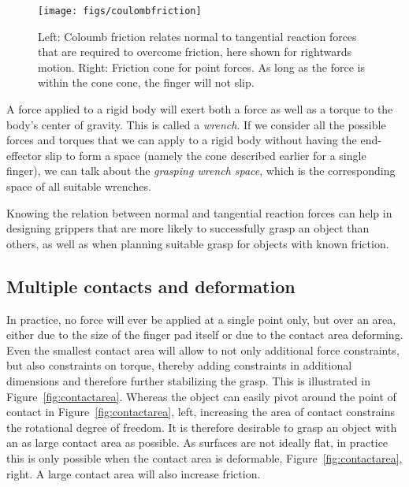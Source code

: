 \begin{figure}
\texttt{[image: figs/coulombfriction]}
\caption{Left: Coloumb friction relates normal to tangential reaction forces that are required to overcome friction, here shown for rightwards motion. Right: Friction cone for point forces. As long as the force is within the cone cone, the finger will not slip.} 
\end{figure}

A force applied to a rigid body will exert both a force as well as a torque to the body's center of gravity. This is called a \emph{wrench}. If we consider all the possible forces and torques that we can apply to a rigid body without having the end-effector slip to form a space (namely the cone described earlier for a single finger), we can talk about the \emph{grasping wrench space}, which is the corresponding space of all suitable wrenches.

Knowing the relation between normal and tangential reaction forces can help in designing grippers that are more likely to successfully grasp an object than others, as well as when planning suitable grasp for objects with known friction.


\subsection{Multiple contacts and deformation}
In practice, no force will ever be applied at a single point only, but over an area, either due to the size of the finger pad itself or due to the contact area deforming. Even the smallest contact area will allow to not only additional force constraints, but also constraints on torque, thereby adding constraints in additional dimensions and therefore further stabilizing the grasp. This is illustrated in Figure~\ref{fig:contactarea}. Whereas the object can easily pivot around the point of contact in Figure~\ref{fig:contactarea}, left, increasing the area of contact constrains the rotational degree of freedom. It is therefore desirable to grasp an object with an as large contact area as possible. As surfaces are not ideally flat, in practice this is only possible when the contact area is deformable, Figure~\ref{fig:contactarea}, right. A large contact area will also increase friction.

